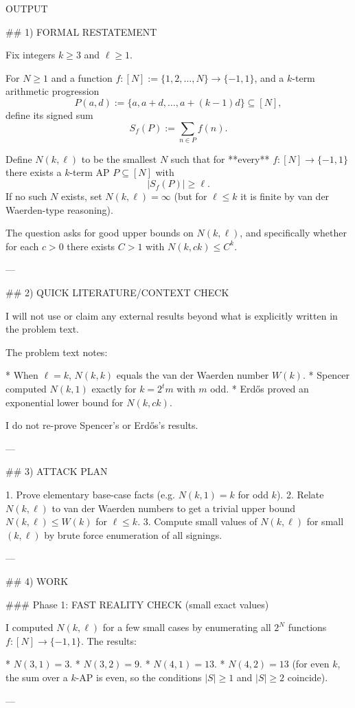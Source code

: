 OUTPUT

## 1) FORMAL RESTATEMENT

Fix integers $k\ge 3$ and $\ell\ge 1$.

For $N\ge 1$ and a function $f:[N]:=\{1,2,\dots,N\}\to\{-1,1\}$, and a $k$-term arithmetic progression
\[
P(a,d):=\{a,a+d,\dots,a+(k-1)d\}\subseteq [N],
\]
define its signed sum
\[
S_f(P):=\sum_{n\in P} f(n).
\]

Define $N(k,\ell)$ to be the smallest $N$ such that for **every** $f:[N]\to\{-1,1\}$ there exists a $k$-term AP $P\subseteq [N]$ with
\[
|S_f(P)|\ge \ell.
\]
If no such $N$ exists, set $N(k,\ell)=\infty$ (but for $\ell\le k$ it is finite by van der Waerden-type reasoning).

The question asks for good upper bounds on $N(k,\ell)$, and specifically whether for each $c>0$ there exists $C>1$ with $N(k,ck)\le C^k$.

---

## 2) QUICK LITERATURE/CONTEXT CHECK

I will not use or claim any external results beyond what is explicitly written in the problem text.

The problem text notes:

* When $\ell=k$, $N(k,k)$ equals the van der Waerden number $W(k)$.
* Spencer computed $N(k,1)$ exactly for $k=2^t m$ with $m$ odd.
* Erd\H{o}s proved an exponential lower bound for $N(k,ck)$.

I do not re-prove Spencer’s or Erd\H{o}s’s results.

---

## 3) ATTACK PLAN

1. Prove elementary base-case facts (e.g. $N(k,1)=k$ for odd $k$).
2. Relate $N(k,\ell)$ to van der Waerden numbers to get a trivial upper bound $N(k,\ell)\le W(k)$ for $\ell\le k$.
3. Compute small values of $N(k,\ell)$ for small $(k,\ell)$ by brute force enumeration of all signings.

---

## 4) WORK

### Phase 1: FAST REALITY CHECK (small exact values)

I computed $N(k,\ell)$ for a few small cases by enumerating all $2^N$ functions $f:[N]\to\{-1,1\}$.
The results:

* $N(3,1)=3$.
* $N(3,2)=9$.
* $N(4,1)=13$.
* $N(4,2)=13$ (for even $k$, the sum over a $k$-AP is even, so the conditions $|S|\ge 1$ and $|S|\ge 2$ coincide).

---


